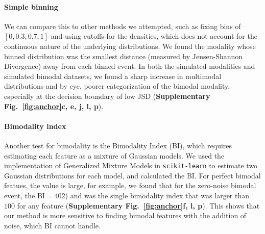 \paragraph{Simple binning}
We can compare this to other methods we attempted, such as fixing bins of $[0, 0.3, 0.7, 1]$ and using cutoffs for the densities, which does not account for the continuous nature of the underlying distributions. We found the modality whose binned distribution was the smallest distance (measured by Jensen-Shannon Divergence\cite{Anonymous:2011vn}) away from each binned event. In both the simulated modalities and simulated bimodal datasets, we found a sharp increase in multimodal distributions and by eye, poorer categorization of the bimodal modality, especially at the decision boundary of low JSD (\textbf{Supplementary Fig.~\ref{fig:anchor}c, e, j, l, p}).



\paragraph{Bimodality index}
Another test for bimodality is the Bimodality Index\cite{Wang:2009wm} (BI), which requires estimating each feature as a mixture of Gaussian models. We used the implementation of Generalized Mixture Models in \texttt{scikit-learn}\cite{Pedregosa:2011tv} to estimate two Gaussian distributions for each model, and calculated the BI. For perfect bimodal featues, the value is large, for example, we found that for the zero-noise bimodal event, the $\mathrm{BI}=402$) and was the single bimodality index that was larger than $100$ for any feature (\textbf{Supplementary Fig.~\ref{fig:anchor}f, l, p}). This shows that our method is more sensitive to finding bimodal features with the addition of noise, which BI cannot handle.

